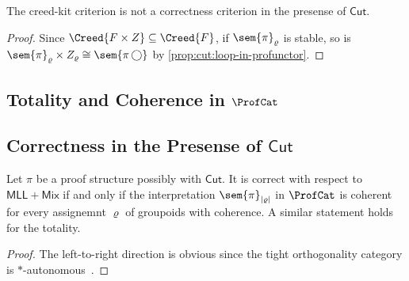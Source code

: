 \begin{corollary}\label{cor:cut:failure-of-creed-kit}
    The creed-kit criterion is not a correctness criterion in the presense of \( \mathsf{Cut} \).
\end{corollary}
\begin{proof}
    Since \( \Creed{F \times Z} \subseteq \Creed{F} \), if \( \sem{\pi}_{\varrho} \) is stable, so is \( \sem{\pi}_\varrho \times Z_\varrho \cong \sem{\pi\,\bigcirc} \) by \cref{prop:cut:loop-in-profunctor}. 
\end{proof}

\subsection{Totality and Coherence in $\ProfCat$}



\subsection{Correctness in the Presense of $\mathsf{Cut}$}

\begin{theorem}
    Let \( \pi \) be a proof structure possibly with \( \mathsf{Cut} \).
    It is correct with respect to \( \mathsf{MLL+Mix} \) if and only if the interpretation \( \sem{\pi}_{|\varrho|} \) in \( \ProfCat \) is coherent for every assignemnt \( \varrho \) of groupoids with coherence.
    A similar statement holds for the totality.
\end{theorem}
\begin{proof}
    The left-to-right direction is obvious since the tight orthogonality category is \( * \)-autonomous~\cite{Hyland2003}.
\end{proof}

